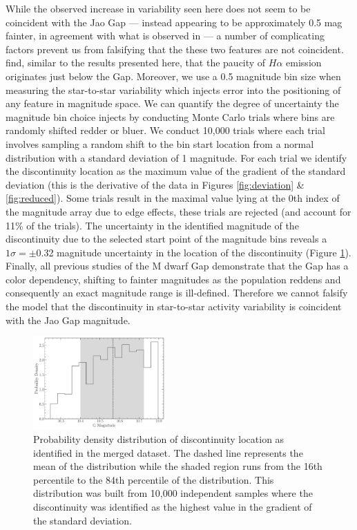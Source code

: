 While the observed increase in variability seen here does not seem to be
coincident with the Jao Gap --- instead appearing to be approximately 0.5 mag
fainter, in agreement with what is observed in \citet{Jao2023} --- a number of
complicating factors prevent us from falsifying that the these two features are
not coincident. \citeauthor{Jao2023} find, similar to the results presented
here, that the paucity of $H\alpha$ emission originates just below the Gap.
Moreover, we use a 0.5 magnitude bin size when measuring the star-to-star
variability which injects error into the positioning of any feature in
magnitude space. We can quantify the degree of uncertainty the magnitude bin
choice injects by conducting Monte Carlo trials where bins are randomly shifted
redder or bluer. We conduct 10,000 trials where each trial involves sampling a
random shift to the bin start location from a normal distribution with a
standard deviation of 1 magnitude. For each trial we identify the discontinuity
location as the maximum value of the gradient of the standard deviation (this
is the derivative of the data in Figures \ref{fig:deviation} \&
\ref{fig:reduced}). Some trials result in the maximal value lying at the 0th
index of the magnitude array due to edge effects, these trials are rejected
(and account for 11\% of the trials). The uncertainty in the identified
magnitude of the discontinuity due to the selected start point of the magnitude
bins reveals a $1\sigma = \pm$0.32 magnitude uncertainty in the location of the
discontinuity (Figure \ref{fig:GapLocationMC}). Finally, all previous studies
of the M dwarf Gap \citep{Jao2018, Jao2021, Mansfield2021, Boudreaux2022,
Jao2023} demonstrate that the Gap has a color dependency, shifting to fainter
magnitudes as the population reddens and consequently an exact magnitude range
is ill-defined. Therefore we cannot falsify the model that the discontinuity in
star-to-star activity variability is coincident with the Jao Gap magnitude.

\begin{figure}
  \centering
  \includegraphics[width=0.45\textwidth]{GapLocationMC.pdf}
  \caption{Probability density distribution of discontinuity location as
  identified in the merged dataset. The dashed line represents the mean of the
  distribution while the shaded region runs from the 16th percentile to the
  84th percentile of the distribution. This distribution was built from 10,000
  independent samples where the discontinuity was identified as the highest
  value in the gradient of the standard deviation.}
  \label{fig:GapLocationMC}
\end{figure}

